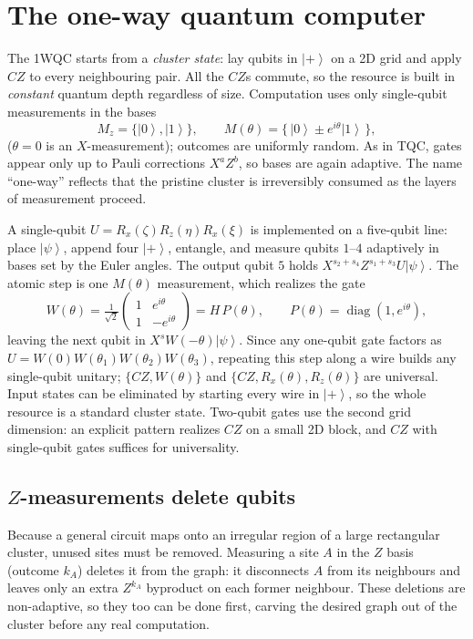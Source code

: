\documentclass[11pt]{article}
\newcommand{\ket}[1]{\left|#1\right\rangle}
\DeclareMathOperator{\diag}{diag}
\theoremstyle{plain}
\begin{document}
\section{The one-way quantum computer}
The 1WQC starts from a \emph{cluster state}: lay qubits in $\ket{+}$ on a 2D grid and apply $CZ$ to
every neighbouring pair. All the $CZ$s commute, so the resource is built in \emph{constant} quantum
depth regardless of size. Computation uses only single-qubit measurements in the bases
\[ M_z = \{\ket{0},\ket{1}\}, \qquad M(\theta) = \{\,\ket{0} \pm e^{i\theta}\ket{1}\,\}, \]
($\theta=0$ is an $X$-measurement); outcomes are uniformly random. As in TQC, gates appear only up to
Pauli corrections $X^aZ^b$, so bases are again adaptive. The name ``one-way'' reflects that the
pristine cluster is irreversibly consumed as the layers of measurement proceed.

A single-qubit $U=R_x(\zeta)R_z(\eta)R_x(\xi)$ is implemented on a five-qubit line: place
$\ket{\psi}$, append four $\ket{+}$, entangle, and measure qubits $1$--$4$ adaptively in bases set by
the Euler angles. The output qubit $5$ holds $X^{s_2+s_4}Z^{s_1+s_3}U\ket{\psi}$. The atomic step is
one $M(\theta)$ measurement, which realizes the gate
\[ W(\theta) = \tfrac{1}{\sqrt2}\begin{pmatrix} 1 & e^{i\theta} \\ 1 & -e^{i\theta}\end{pmatrix}
   = H\,P(\theta), \qquad P(\theta)=\diag(1, e^{i\theta}), \]
leaving the next qubit in $X^{s}W(-\theta)\ket{\psi}$. Since any one-qubit gate factors as
$U=W(0)W(\theta_1)W(\theta_2)W(\theta_3)$, repeating this step along a wire builds any single-qubit
unitary; $\{CZ, W(\theta)\}$ and $\{CZ, R_x(\theta), R_z(\theta)\}$ are universal. Input states can be
eliminated by starting every wire in $\ket{+}$, so the whole resource is a standard cluster state.
Two-qubit gates use the second grid dimension: an explicit pattern realizes $CZ$ on a small 2D block,
and $CZ$ with single-qubit gates suffices for universality.

\subsection*{$Z$-measurements delete qubits}
Because a general circuit maps onto an irregular region of a large rectangular cluster, unused sites
must be removed. Measuring a site $A$ in the $Z$ basis (outcome $k_A$) deletes it from the graph: it
disconnects $A$ from its neighbours and leaves only an extra $Z^{k_A}$ byproduct on each former
neighbour. These deletions are non-adaptive, so they too can be done first, carving the desired graph
out of the cluster before any real computation.
\end{document}
